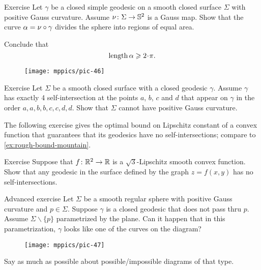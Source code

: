 \begin{thm}{Exercise}\label{ex:geodesic-half}
Let $\gamma$ be a closed simple geodesic on a smooth closed surface $\Sigma$ with positive Gauss curvature.
Assume $\nu\colon\Sigma\to\mathbb{S}^2$ is a Gauss map.
Show that the curve $\alpha=\nu\circ\gamma$ divides the sphere into regions of equal area.

Conclude that
\[\length \alpha\ge 2\cdot\pi.\]
\end{thm}

{

\begin{wrapfigure}[4]{r}{25 mm}
\vskip-8mm
\centering
\texttt{[image: mppics/pic-46]}
\vskip-0mm
\end{wrapfigure}

\begin{thm}{Exercise}\label{ex:aabbccdd}
Let $\Sigma$ be a smooth closed surface with a closed geodesic $\gamma$.
Assume $\gamma$ has exactly 4 self-intersection at the points $a$, $b$, $c$ and $d$ that appear on $\gamma$ in the order $a,a,b,b,c,c,d,d$.
Show that $\Sigma$ cannot have positive Gauss curvature.
\end{thm}

The following exercise gives the optimal bound on Lipschitz constant of a convex function that guarantees that its geodesics have no self-intersections;
compare to \ref{ex:rough-bound-mountain}.

\begin{thm}{Exercise}\label{ex:sqrt(3)}
Suppose that $f\colon\mathbb{R}^2\to\mathbb{R}$ is a $\sqrt{3}$-Lipschitz smooth convex function.
Show that any geodesic in the surface defined by the graph $z=f(x,y)$ has no self-intersections.
\end{thm}

\begin{thm}{Advanced exercise}
Let $\Sigma$ be a smooth regular sphere with positive Gauss curvature and $p\in\Sigma$. 
Suppose $\gamma$ is a closed geodesic that does not pass thru $p$.
Assume $\Sigma\backslash\{p\}$ parametrized by the plane.
Can it happen that in this parametrization,  $\gamma$ looks like one of the curves on the diagram?
\begin{figure}[h!]
\vskip-0mm
\centering
\texttt{[image: mppics/pic-47]}
\vskip-0mm
\end{figure}
Say as much as possible about possible/impossible diagrams of that type.
\end{thm}

}
